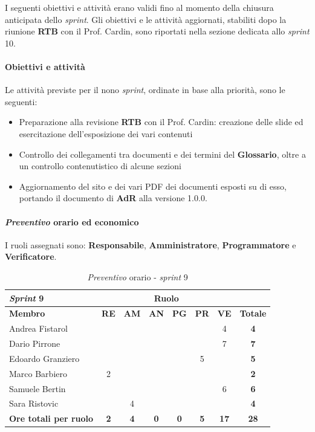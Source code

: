 \documentclass[12pt, a4paper]{article}
\begin{document}
{I seguenti obiettivi e attività erano validi fino al momento della chiusura anticipata dello \textit{sprint}. Gli obiettivi e le attività aggiornati, stabiliti dopo la riunione \textbf{RTB} con il Prof. Cardin, sono riportati nella sezione dedicata allo \textit{sprint} 10.

\paragraph{Obiettivi e attività}

Le attività previste per il nono \textit{sprint}, ordinate in base alla priorità, sono le seguenti:

\begin{itemize}
    \item Preparazione alla revisione \textbf{RTB} con il Prof. Cardin: creazione delle slide ed esercitazione dell'esposizione dei vari contenuti
    \item Controllo dei collegamenti tra documenti e dei termini del \textbf{Glossario}, oltre a un controllo contenutistico di alcune sezioni
    \item Aggiornamento del sito e dei vari PDF dei documenti esposti su di esso, portando il documento di \textbf{AdR} alla versione 1.0.0.
\end{itemize}

\paragraph{\textit{Preventivo} orario ed economico}

I ruoli assegnati sono: \textbf{Responsabile}, \textbf{Amministratore}, \textbf{Programmatore} e \textbf{Verificatore}.
\begin{table}[H]
    \centering
    \renewcommand{\arraystretch}{1.3}
    \begin{tabularx}{0.9\textwidth}{|X|c|c|c|c|c|c|c|}
        \hline
        \textbf{\textit{Sprint} 9} & \multicolumn{6}{|c|}{\textbf{Ruolo}} & \\ \hline
        \textbf{Membro} & \textbf{RE} & \textbf{AM} & \textbf{AN} & \textbf{PG} & \textbf{PR} & \textbf{VE} & \textbf{Totale} \\ \hline
        Andrea Fistarol  & & & & & & 4 & \textbf{4} \\ \hline
        Dario Pirrone    & & & & & & 7 & \textbf{7} \\ \hline
        Edoardo Granziero & & & & & 5 & & \textbf{5} \\ \hline
        Marco Barbiero   & 2 & & & & & & \textbf{2} \\ \hline
        Samuele Bertin   & & & & & & 6 & \textbf{6} \\ \hline
        Sara Ristovic    & & 4 & & & & & \textbf{4} \\ \hline
        \textbf{Ore totali per ruolo} & \textbf{2} & \textbf{4} & \textbf{0} & \textbf{0} & \textbf{5} & \textbf{17} & \textbf{28} \\ \hline
    \end{tabularx}
    \caption{\textit{Preventivo} orario - \textit{sprint} 9}
\end{table}

}
\end{document}
